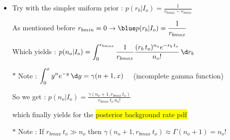 \Tr
\begin{itemize}
\item Try with the simpler uniform prior : $\displaystyle p(r_{b}|I_{o})=\frac{1}{r_{bmax}-r_{bmin}}$
\item[] As mentioned before $\displaystyle r_{bmin}=0 \rightarrow {\blue p(r_{b}|I_{o})=\frac{1}{r_{bmax}}}$\\
\item[] Which yields :  {\blue $\displaystyle p(n_{o}|I_{o})=\int_{0}^{r_{bmax}}
                         \frac{1}{r_{bmax}}
                         \frac{(r_{b}\,t_{o})^{n_{o}} e^{-r_{b}\,t_{o}}}{n_{o}!}\,\d r_{b}$}
\item[$\ast$] Note : $\displaystyle \int_{0}^{x} y^{n} e^{-y}\,\d y=\gamma(n+1,x) \quad$ (incomplete gamma function)\\
\item[] So we get : {\blue $\displaystyle p(n_{o}|I_{o})=\frac{\gamma(n_{o}+1,r_{bmax}\,t_{o})}{r_{bmax}\,t_{o}\,n_{o}!}$}
\item[] which finally yields for the \colorbox{yellow}{posterior background rate pdf}
\item[] \begin{center}
        {\blue {}}
        \end{center}
\item[$\ast$] Note : If $r_{bmax}\,t_{o} \gg n_{o}$ then $\gamma(n_{o}+1,r_{bmax}\,t_{o}) \approx \Gamma(n_{o}+1)=n_{o}!$
\end{itemize}

